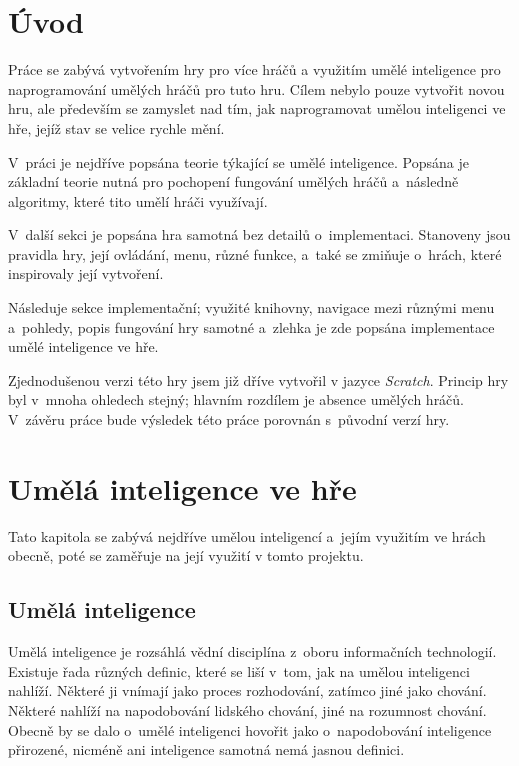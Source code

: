 \chapter{Úvod}

Práce se zabývá vytvořením hry pro více hráčů a využitím umělé inteligence pro naprogramování umělých hráčů pro tuto hru. Cílem nebylo pouze vytvořit novou hru, ale především se zamyslet nad tím, jak naprogramovat umělou inteligenci ve hře, jejíž stav se velice rychle mění.


V~práci je nejdříve popsána teorie týkající se umělé inteligence. Popsána je základní teorie nutná pro pochopení fungování umělých hráčů a~následně algoritmy, které tito umělí hráči využívají.

V~další sekci je popsána hra samotná bez detailů o~implementaci. Stanoveny jsou pravidla hry, její ovládání, menu, různé funkce, a~také se zmiňuje o~hrách, které inspirovaly její vytvoření.

Následuje sekce implementační; využité knihovny, navigace mezi různými menu a~pohledy, popis fungování hry samotné a~zlehka je zde popsána implementace umělé inteligence ve hře.

Zjednodušenou verzi této hry jsem již dříve vytvořil v jazyce \emph{Scratch}. Princip hry byl v~mnoha ohledech stejný; hlavním rozdílem je absence umělých hráčů. V~závěru práce bude výsledek této práce porovnán s~původní verzí hry. 


\chapter{Umělá inteligence ve hře}

Tato kapitola se zabývá nejdříve umělou inteligencí a~jejím využitím ve hrách obecně, poté se zaměřuje na její využití v tomto projektu.


\section{Umělá inteligence}

Umělá inteligence je rozsáhlá vědní disciplína z~oboru informačních technologií. Existuje řada různých definic, které se liší v~tom, jak na umělou inteligenci nahlíží. Některé ji vnímají jako proces rozhodování, zatímco jiné jako chování. Některé nahlíží na napodobování lidského chování, jiné na rozumnost chování. Obecně by se dalo o~umělé inteligenci hovořit jako o~napodobování inteligence přirozené, nicméně ani inteligence samotná nemá jasnou definici.

